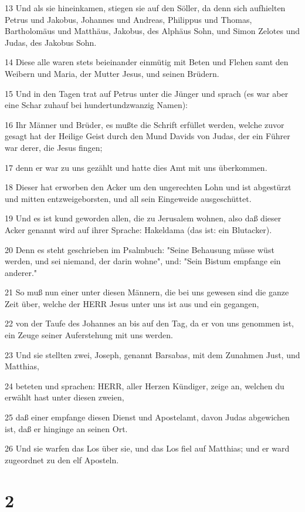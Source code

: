 \par 13 Und als sie hineinkamen, stiegen sie auf den Söller, da denn sich aufhielten Petrus und Jakobus, Johannes und Andreas, Philippus und Thomas, Bartholomäus und Matthäus, Jakobus, des Alphäus Sohn, und Simon Zelotes und Judas, des Jakobus Sohn.
\par 14 Diese alle waren stets beieinander einmütig mit Beten und Flehen samt den Weibern und Maria, der Mutter Jesus, und seinen Brüdern.
\par 15 Und in den Tagen trat auf Petrus unter die Jünger und sprach (es war aber eine Schar zuhauf bei hundertundzwanzig Namen):
\par 16 Ihr Männer und Brüder, es mußte die Schrift erfüllet werden, welche zuvor gesagt hat der Heilige Geist durch den Mund Davids von Judas, der ein Führer war derer, die Jesus fingen;
\par 17 denn er war zu uns gezählt und hatte dies Amt mit uns überkommen.
\par 18 Dieser hat erworben den Acker um den ungerechten Lohn und ist abgestürzt und mitten entzweigeborsten, und all sein Eingeweide ausgeschüttet.
\par 19 Und es ist kund geworden allen, die zu Jerusalem wohnen, also daß dieser Acker genannt wird auf ihrer Sprache: Hakeldama (das ist: ein Blutacker).
\par 20 Denn es steht geschrieben im Psalmbuch: "Seine Behausung müsse wüst werden, und sei niemand, der darin wohne", und: "Sein Bistum empfange ein anderer."
\par 21 So muß nun einer unter diesen Männern, die bei uns gewesen sind die ganze Zeit über, welche der HERR Jesus unter uns ist aus und ein gegangen,
\par 22 von der Taufe des Johannes an bis auf den Tag, da er von uns genommen ist, ein Zeuge seiner Auferstehung mit uns werden.
\par 23 Und sie stellten zwei, Joseph, genannt Barsabas, mit dem Zunahmen Just, und Matthias,
\par 24 beteten und sprachen: HERR, aller Herzen Kündiger, zeige an, welchen du erwählt hast unter diesen zweien,
\par 25 daß einer empfange diesen Dienst und Apostelamt, davon Judas abgewichen ist, daß er hinginge an seinen Ort.
\par 26 Und sie warfen das Los über sie, und das Los fiel auf Matthias; und er ward zugeordnet zu den elf Aposteln.

\chapter{2}

